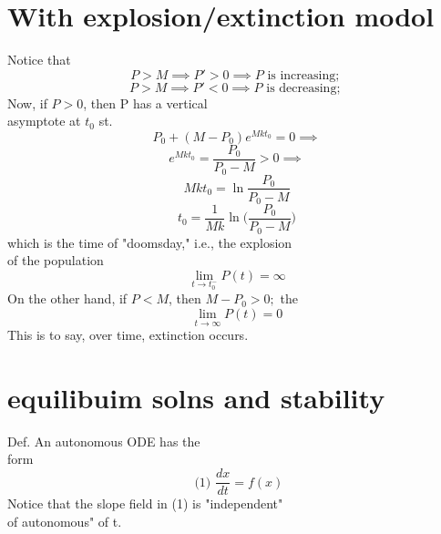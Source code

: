 \documentclass[10pt,a4paper]{article}
\begin{document}
\section*{With explosion/extinction modol}
  Notice that 
  \[ P>M \implies P'>0 \implies P \text{ is increasing; } \]
  \[ P>M \implies P'<0 \implies P \text{ is decreasing; } \]
  Now, if \( P>0 \), then P has a vertical \\
  asymptote at \( t_0 \) st. 
  \[ P_0 + (M-P_0)e^{Mkt_0} = 0 \implies \]
  \[ e^{Mkt_0} = \frac{P_0}{P_0 - M}>0 \implies \]
  \[ Mkt_0 = \ln \frac{P_0}{P_0-M} \]
  \[ \boxed{t_0 = \frac{1}{Mk} \ln \bigg( \frac{P_0}{P_0-M} \bigg)} \]
  which is the time of "doomsday," i.e., the explosion \\
  of the population \\ 
  \[ \lim_{t \to t_0^-} P(t) = \infty \]
  On the other hand, if \( P<M \), then \( M-P_0>0; \) the
  \[ \lim_{t \to \infty} P(t) = 0 \]
  This is to say, over time, extinction occurs. 


  \newpage 
\section*{equilibuim solns and stability}
  Def. An autonomous ODE has the \\
  form 
  \[ \text{ (1) } \frac{dx}{dt} = f(x) \]
  Notice that the slope field in (1) is "independent" \\
  of autonomous" of t. \\
\end{document}
